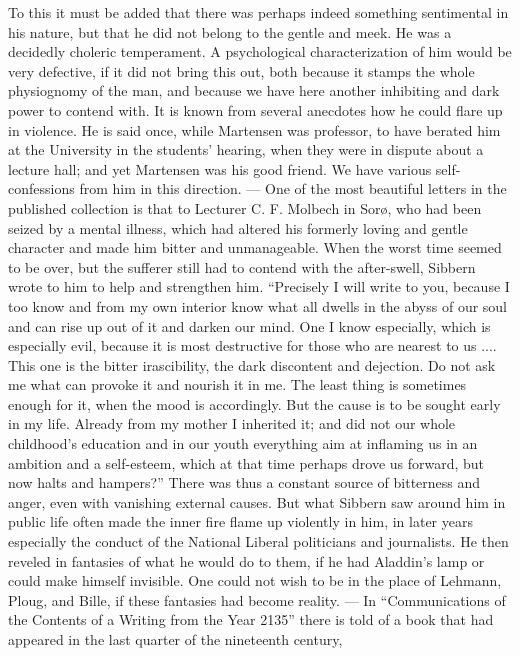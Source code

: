 \documentclass[12pt,a4paper,openany]{book}
\newcommand{\opage}[1]{\marginnote{\footnotesize\textit{[#1]}}}
\begin{document}
To this it must be added that there was perhaps indeed something sentimental in
his nature, but that he did not belong to the gentle and meek.
He was a decidedly choleric temperament. A psychological
characterization of him would be very defective, if it did not
bring this out, both because it stamps the whole physiognomy
of the man, and because we have here another inhibiting and
dark power to contend with. It is known from several
anecdotes how he could flare up in violence. He is said once,
while Martensen was professor, to have berated him
at the University in the students' hearing, when they were in dispute
about a lecture hall; and yet Martensen was his good friend.
We have various self-confessions from him in this direction.
--- One of the most beautiful letters in the published collection is that
to Lecturer C. F. Molbech in Sorø, who had been seized by
a mental illness, which had altered his formerly loving and
gentle character and made him bitter and unmanageable. When
the worst time seemed to be over, but the sufferer still
had to contend with the after-swell, Sibbern wrote to
\opage{72}him to help and strengthen him. ``Precisely I will write to
you, because I too know and from my own interior know what
all dwells in the abyss of our soul and can rise up out of it and
darken our mind. One I know especially, which is especially evil,
because it is most destructive for those who are nearest
to us .... This one is the bitter irascibility, the dark
discontent and dejection. Do not ask me what can
provoke it and nourish it in me. The least thing is
sometimes enough for it, when the mood is accordingly. But the cause
is to be sought early in my life. Already from my mother
I inherited it; and did not our whole childhood's education and
in our youth everything aim at inflaming us in an ambition and
a self-esteem, which at that time perhaps drove us forward, but
now halts and hampers?'' There was thus a constant source of
bitterness and anger, even with vanishing external causes.
But what Sibbern saw around him in public life often made
the inner fire flame up violently in him, in later
years especially the conduct of the National Liberal politicians and journalists.
He then reveled in fantasies of what he would
do to them, if he had Aladdin's lamp or could
make himself invisible. One could not wish to be in the place of
Lehmann, Ploug, and Bille, if these fantasies had
become reality. --- In ``Communications of the Contents of a
Writing from the Year 2135'' there is told of a book that had
appeared in the last quarter of the nineteenth century,
\end{document}
